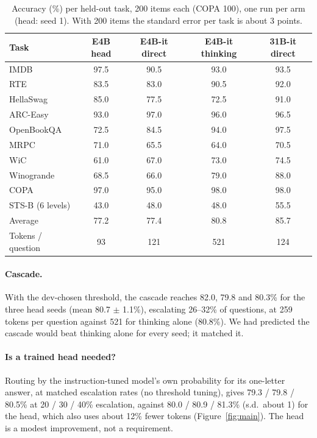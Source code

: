 \documentclass[11pt]{article}
\begin{document}
\begin{table}[t]
\centering\small
\begin{tabular}{lcccc}
\toprule
Task & E4B head & E4B-it direct & E4B-it thinking & 31B-it direct \\
\midrule
IMDB & 97.5 & 90.5 & 93.0 & 93.5 \\
RTE & 83.5 & 83.0 & 90.5 & 92.0 \\
HellaSwag & 85.0 & 77.5 & 72.5 & 91.0 \\
ARC-Easy & 93.0 & 97.0 & 96.0 & 96.5 \\
OpenBookQA & 72.5 & 84.5 & 94.0 & 97.5 \\
MRPC & 71.0 & 65.5 & 64.0 & 70.5 \\
WiC & 61.0 & 67.0 & 73.0 & 74.5 \\
Winogrande & 68.5 & 66.0 & 79.0 & 88.0 \\
COPA & 97.0 & 95.0 & 98.0 & 98.0 \\
STS-B (6 levels) & 43.0 & 48.0 & 48.0 & 55.5 \\
\midrule
Average & 77.2 & 77.4 & 80.8 & 85.7 \\
Tokens / question & 93 & 121 & 521 & 124 \\
\bottomrule
\end{tabular}
\caption{Accuracy (\%) per held-out task, 200 items each (COPA 100), one run per arm (head: seed 1). With 200
items the standard error per task is about 3 points.}
\label{tab:tasks}
\end{table}

\paragraph{Cascade.} With the dev-chosen threshold, the cascade reaches 82.0, 79.8 and 80.3\% for the three head
seeds (mean 80.7 $\pm$ 1.1\%), escalating 26--32\% of questions, at 259 tokens per question against 521 for
thinking alone (80.8\%). We had predicted the cascade would beat thinking alone for every seed; it matched it.

\paragraph{Is a trained head needed?} Routing by the instruction-tuned model's own probability for its one-letter
answer, at matched escalation rates (no threshold tuning), gives 79.3 / 79.8 / 80.5\% at 20 / 30 / 40\% escalation,
against 80.0 / 80.9 / 81.3\% (s.d.\ about 1) for the head, which also uses about 12\% fewer tokens
(Figure~\ref{fig:main}). The head is a modest improvement, not a requirement.
\end{document}
